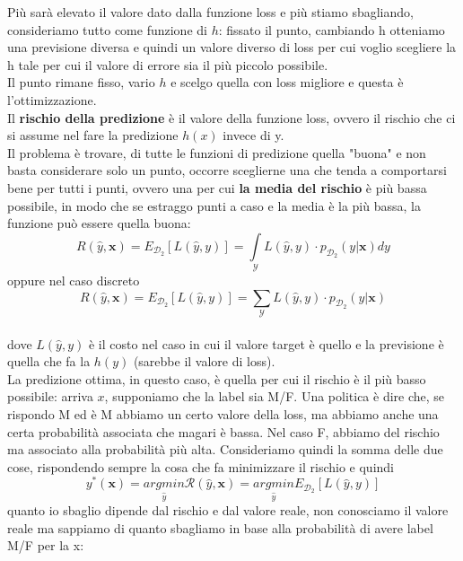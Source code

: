 \documentclass[12pt, oneside]{extbook}
\begin{document}
Più sarà elevato il valore dato dalla funzione loss e più stiamo sbagliando, consideriamo tutto come funzione di $h$: fissato il punto, cambiando h otteniamo una previsione diversa e quindi un valore diverso di loss per cui voglio scegliere la h tale per cui il valore di errore sia il più piccolo possibile.\\Il punto rimane fisso, vario $h$ e scelgo quella con loss migliore e questa è l'ottimizzazione.\\Il \textbf{rischio della predizione} è il valore della funzione loss, ovvero il rischio che ci si assume nel fare la predizione $h(x)$ invece di y.\\Il problema è trovare, di tutte le funzioni di predizione quella "buona" e non basta considerare solo un punto, occorre sceglierne una che tenda a comportarsi bene per tutti i punti, ovvero una per cui \textbf{la media del rischio} è più bassa possibile, in modo che se estraggo punti a caso e la media è la più bassa, la funzione può essere quella buona:
\begin{equation}
	R(\hat{y}, \boldsymbol{x}) = E_ {\mathscr{D}_2}[L(\hat{y}, y)] = \int\limits_{\mathscr{Y}} L(\hat{y}, y) \cdot p_{\mathscr{D}_2}(y|\boldsymbol{x}) dy
\end{equation}
oppure nel caso discreto\\
\begin{equation}
	R(\hat{y}, \boldsymbol{x}) = E_ {\mathscr{D}_2}[L(\hat{y}, y)] = \sum\limits_{\mathscr{Y}} L(\hat{y}, y) \cdot p_{\mathscr{D}_2}(y|\boldsymbol{x})
\end{equation}\\
dove $L(\hat{y}, y)$ è il costo nel caso in cui il valore target è quello e la previsione è quella che fa la $h(y)$ (sarebbe il valore di loss).\\La predizione ottima, in questo caso, è quella per cui il rischio è il più basso possibile: arriva $x$, supponiamo che la label sia M/F. Una politica è dire che, se rispondo M ed è M abbiamo un certo valore della loss, ma abbiamo anche una certa probabilità associata che magari è bassa. Nel caso F, abbiamo del rischio ma associato alla probabilità più alta. Consideriamo quindi la somma delle due cose, rispondendo sempre la cosa che fa minimizzare il rischio e quindi 
\begin{equation}
	y^*(\boldsymbol{x}) = \underset{\hat{y}}{argmin} \mathscr{R}(\hat{y}, \boldsymbol{x}) =  \underset{\hat{y}}{argmin} E_{\mathscr{D}_2}[L(\hat{y}, y)] 
\end{equation}
quanto io sbaglio dipende dal rischio e dal valore reale, non conosciamo il valore reale ma sappiamo di quanto sbagliamo in base alla probabilità di avere label M/F per la x:
\end{document}
